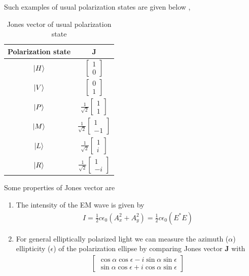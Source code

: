 \documentclass[11pt,a4paper]{article}
\numberwithin{equation}{section}
\begin{document}
Such examples of usual polarization states are given below \cite{jones},
\begin{table}[H]
	\centering
	\begin{tabular}{ c c } 
		\hline
		\hline
		Polarization state & $\boldsymbol{J}$\\
		\hline
		$\ket{H}$ & $\begin{bmatrix}1\\0\end{bmatrix}$ \\ \hline
		$\ket{V}$ & $\begin{bmatrix}0\\1\end{bmatrix}$ \\ \hline
		$\ket{P}$ & $\frac{1}{\sqrt{2}}\begin{bmatrix}1\\1\end{bmatrix}$ \\ \hline
		$\ket{M}$ & $\frac{1}{\sqrt{2}}\begin{bmatrix}1\\-1\end{bmatrix}$ \\ \hline
		$\ket{L}$ & $\frac{1}{\sqrt{2}}\begin{bmatrix}1\\i\end{bmatrix}$ \\ \hline
		$\ket{R}$ & $\frac{1}{\sqrt{2}}\begin{bmatrix}1\\-i\end{bmatrix}$ \\ 
		\hline
		\hline
	\end{tabular}
	\caption{Jones vector of usual polarization state}
	\label{table:1}
\end{table}

Some properties of Jones vector are
\begin{enumerate}
	\item The intensity of the EM wave is given by 
	\begin{align}
		I= \frac{1}{2}c\epsilon_0(A_x^2+A_y^2) = \frac{1}{2}c\epsilon_0 (E^\ast E)
	\end{align}
	\item For general elliptically polarized light we can measure the azimuth ($\alpha$) ellipticity ($\epsilon$) of the polarization ellipse by comparing Jones vector $\boldsymbol{J}$ with \cite{WO}
	\begin{align*}
		\begin{bmatrix}
			\cos\alpha\cos\epsilon- i \sin\alpha\sin\epsilon \\
			\sin\alpha\cos\epsilon+ i \cos\alpha\sin\epsilon
		\end{bmatrix}
	\end{align*}
\end{enumerate}
\end{document}
